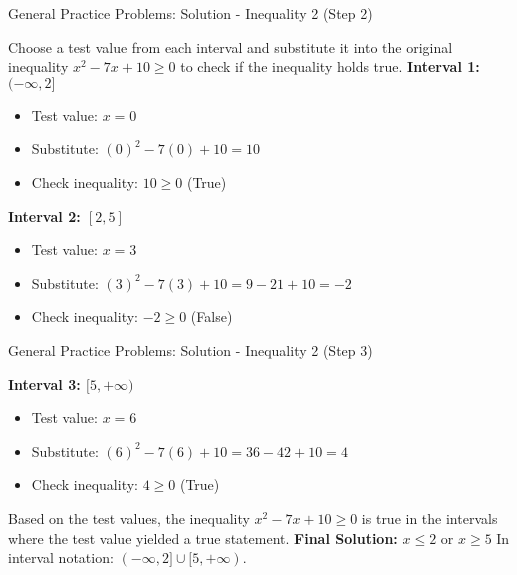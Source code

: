 \documentclass[aspectratio=169]{beamer}
\begin{document}
\begin{frame}{General Practice Problems: Solution - Inequality 2 (Step 2)}
    \begin{tcolorbox}[colback=lightgray,colframe=accent,title=Solution: $x^2 - 7x + 10 \geq 0$ (Step 2 - Use Test Values)]
        \footnotesize
        Choose a test value from each interval and substitute it into the original inequality $x^2 - 7x + 10 \geq 0$ to check if the inequality holds true.
        \newline
        \textbf{Interval 1: $(-\infty, 2]$}
        \begin{itemize}
            \item Test value: $x=0$
            \item Substitute: $(0)^2 - 7(0) + 10 = 10$
            \item Check inequality: $10 \geq 0$ (True)
        \end{itemize}
        \newline
        \textbf{Interval 2: $[2, 5]$}
        \begin{itemize}
            \item Test value: $x=3$
            \item Substitute: $(3)^2 - 7(3) + 10 = 9 - 21 + 10 = -2$
            \item Check inequality: $-2 \geq 0$ (False)
        \end{itemize}
    \end{tcolorbox}
\end{frame}

\begin{frame}{General Practice Problems: Solution - Inequality 2 (Step 3)}
    \begin{tcolorbox}[colback=lightgray,colframe=accent,title=Solution: $x^2 - 7x + 10 \geq 0$ (Step 3 - Final Solution)]
        \footnotesize
        \textbf{Interval 3: $[5, +\infty)$}
        \begin{itemize}
            \item Test value: $x=6$
            \item Substitute: $(6)^2 - 7(6) + 10 = 36 - 42 + 10 = 4$
            \item Check inequality: $4 \geq 0$ (True)
        \end{itemize}
        \newline
        Based on the test values, the inequality $x^2 - 7x + 10 \geq 0$ is true in the intervals where the test value yielded a true statement.
        \newline
        \textbf{Final Solution:} $x \leq 2$ or $x \geq 5$
        \newline
        In interval notation: $(-\infty, 2] \cup [5, +\infty)$.
    \end{tcolorbox}
\end{frame}
\end{document}
